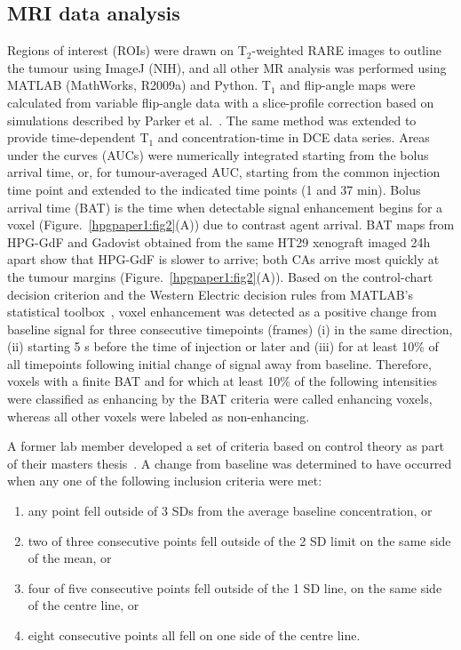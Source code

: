 \subsection{MRI data analysis}
\label{hpg_paper1_mrianalysis}
Regions of interest (ROIs) were drawn on T$_2$-weighted \acs{RARE} images to outline the tumour using ImageJ (NIH), and all other MR analysis was performed using MATLAB (MathWorks, R2009a) and Python.
T$_1$ and flip-angle maps were calculated from variable flip-angle data with a slice-profile correction based on simulations described by Parker et al.~\cite{Parker:2001wj}.
The same method was extended to provide time-dependent T$_1$ and concentration-time in DCE data series.
Areas under the curves (AUCs) were numerically integrated starting from the bolus arrival time, or, for tumour-averaged AUC, starting from the common injection time point and extended to the indicated time points (1 and 37 min).
Bolus arrival time (BAT) is the time when detectable signal enhancement begins for a voxel (Figure.~\ref{hpgpaper1:fig2}(A)) due to contrast agent arrival.
\acs{BAT} maps from \acs{HPG-GdF} and Gadovist obtained from the same HT29 xenograft imaged 24h apart show that \acs{HPG-GdF} is slower to arrive; both \acs{CA}s arrive most quickly at the tumour margins (Figure.~\ref{hpgpaper1:fig2}(A)). 
Based on the control-chart decision criterion and the Western Electric decision rules from MATLAB’s statistical toolbox~\cite{Shewhart:1931tq}, voxel enhancement was detected as a positive change from baseline signal for three consecutive timepoints (frames) (i) in the same direction, (ii) starting 5 s before the time of injection or later and (iii) for at least 10\% of all timepoints following initial change of signal away from baseline.
Therefore, voxels with a finite \acs{BAT} and for which at least 10\% of the following intensities were classified as enhancing by the \acs{BAT} criteria were called enhancing voxels, whereas all other voxels were labeled as non-enhancing.

A former lab member developed a set of criteria based on control theory as part of their masters thesis~\cite{McPhee:2012eu}.
A change from baseline was determined to have occurred when any one of the following inclusion criteria were met:

\begin{enumerate}
	\item any point fell outside of 3 SDs from the average baseline concentration, or
	\item two of three consecutive points fell outside of the 2 SD limit on the same side of the mean, or
	\item four of five consecutive points fell outside of the 1 SD line, on the same side of the centre line, or
	\item eight consecutive points all fell on one side of the centre line.
\end{enumerate}

